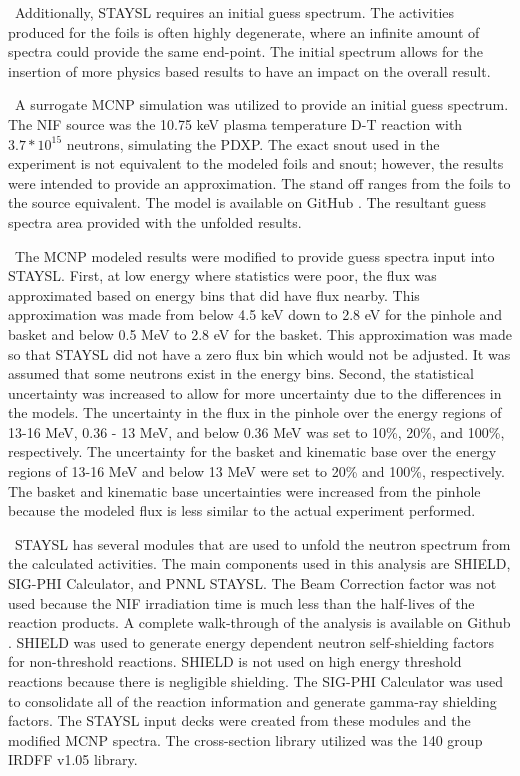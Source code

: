 \documentclass[journal]{IEEEtran}
\begin{document}
	\ Additionally, STAYSL requires an initial guess spectrum. The activities produced for the foils is often highly degenerate, where an infinite amount of spectra could provide the same end-point. The initial spectrum allows for the insertion of more physics based results to have an impact on the overall result. 
	
	\ A surrogate MCNP simulation was utilized to provide an initial guess spectrum. The NIF source was the 10.75 keV plasma temperature D-T reaction with $3.7*10^{15}$ neutrons, simulating the PDXP. The exact snout used in the experiment is not equivalent to the modeled foils and snout; however, the results were intended to provide an approximation. The stand off ranges from the foils to the source equivalent. The model is available on GitHub \cite{Me}. The resultant guess spectra area provided with the unfolded results. 
	
	\ The MCNP modeled results were modified to provide guess spectra input into STAYSL. First, at low energy where statistics were poor, the flux was approximated based on energy bins that did have flux nearby. This approximation was made from below 4.5 keV down to 2.8 eV for the pinhole and basket and below 0.5 MeV to 2.8 eV for the basket.  This approximation was made so that STAYSL did not have a zero flux bin which would not be adjusted. It was assumed that some neutrons exist in the energy bins. Second, the statistical uncertainty was increased to allow for more uncertainty due to the differences in the models. The uncertainty in the flux in the pinhole over the energy regions of 13-16 MeV, 0.36 - 13 MeV, and below 0.36 MeV was set to 10\%, 20\%, and 100\%, respectively. The uncertainty for the basket and kinematic base over the energy regions of 13-16 MeV and below 13 MeV were set to 20\% and 100\%, respectively. The basket and kinematic base uncertainties were increased from the pinhole because the modeled flux is less similar to the actual experiment performed. 
	
	\ STAYSL has several modules that are used to unfold the neutron spectrum from the calculated activities. The main components used in this analysis are SHIELD, SIG-PHI Calculator, and PNNL STAYSL. The Beam Correction factor was not used because the NIF irradiation time is much less than the half-lives of the reaction products. A complete walk-through of the analysis is available on Github \cite{Me}. SHIELD was used to generate energy dependent neutron self-shielding factors for non-threshold reactions. SHIELD is not used on high energy threshold reactions because there is negligible shielding. The SIG-PHI Calculator was used to consolidate all of the reaction information and generate gamma-ray shielding factors. The STAYSL input decks were created from these modules and the modified MCNP spectra. The cross-section library utilized was the 140 group IRDFF v1.05 library. 
	
\end{document}
